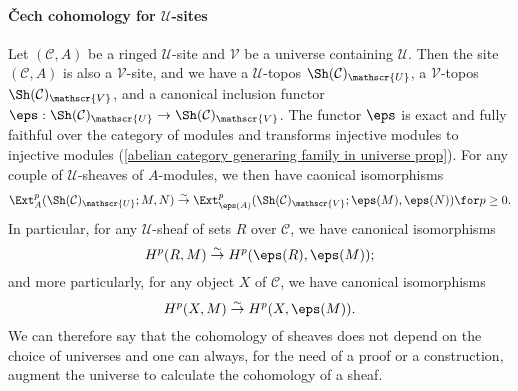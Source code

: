 \paragraph{\v{C}ech cohomology for \texorpdfstring{$\mathscr{U}$}{U}-sites}\label{site cohomology change universe paragraph}
Let $(\mathcal{C},A)$ be a ringed $\mathscr{U}$-site and $\mathscr{V}$ be a universe containing $\mathscr{U}$. Then the site $(\mathcal{C},A)$ is also a $\mathscr{V}$-site, and we have a $\mathscr{U}$-topos $\Sh(\mathcal{C})_\mathscr{U}$, a $\mathscr{V}$-topos $\Sh(\mathcal{C})_\mathscr{V}$, and a canonical inclusion functor $\eps:\Sh(\mathcal{C})_\mathscr{U}\to \Sh(\mathcal{C})_\mathscr{V}$. The functor $\eps$ is exact and fully faithful over the category of modules and transforms injective modules to injective modules (\cref{abelian category generaring family in universe prop}). For any couple of $\mathscr{U}$-sheaves of $A$-modules, we then have caonical isomorphisms
\begin{equation}\label{site cohomology change universe-1}
\Ext_A^p(\Sh(\mathcal{C})_\mathscr{U};M,N)\stackrel{\sim}{\to } \Ext_{\eps(A)}^p(\Sh(\mathcal{C})_\mathscr{V};\eps(M),\eps(N))\for p\geq 0.
\end{equation}
In particular, for any $\mathscr{U}$-sheaf of sets $R$ over $\mathcal{C}$, we have canonical isomorphisms
\begin{equation}\label{site cohomology change universe-2}
H^p(R,M)\stackrel{\sim}{\to } H^p(\eps(R),\eps(M));
\end{equation}
and more particularly, for any object $X$ of $\mathcal{C}$, 
we have canonical isomorphisms
\begin{equation}\label{site cohomology change universe-3}
H^p(X,M)\stackrel{\sim}{\to } H^p(X,\eps(M)).
\end{equation}
We can therefore say that the cohomology of sheaves does not depend on the choice of universes and one can always, for the need of a proof or a construction, augment the universe to calculate the cohomology of a sheaf.\par
